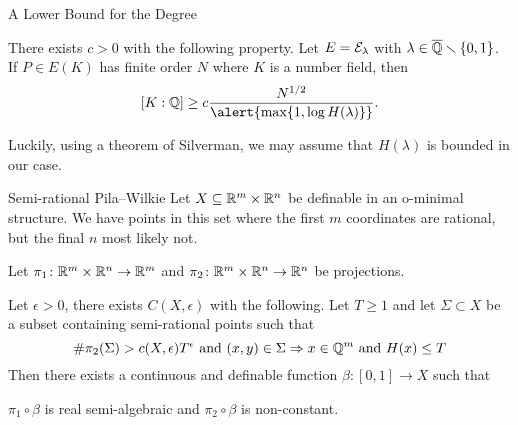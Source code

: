 \documentclass{beamer}
\begin{document}
\begin{frame}{A Lower Bound for the Degree}
  
  \begin{theorem}[David]
    There exists $c>0$ with the following property. 
    Let $E={\mathcal E}_\lambda$ with $\lambda\in{\overline{\mathbb{Q}}}\smallsetminus\{0,1\}$. If $P\in
    E(K)$ has finite order $N$ where $K$ is a number field, then
    \begin{equation}
      \label{eq:davidKQlb}
      [K:\IQ] \ge c \frac{N^{1/2}}{\alert{\max\{1,\log H(\lambda)\}}}.
    \end{equation}    
  \end{theorem}

  Luckily, using a theorem of \alert{Silverman}, we may assume that
  $H(\lambda)$ is bounded in our case.
  

\end{frame}


\begin{frame}{Semi-rational Pila--Wilkie}
  Let $X\subseteq {\mathbb{R}}^m\times{\mathbb{R}}^n$
  be definable in an o-minimal structure. 
  We have points in this set where the
  first $m$ coordinates are rational, but the final $n$ most likely not.

  Let $\pi_1\colon{\mathbb{R}}^m\times{\mathbb{R}}^n\rightarrow{\mathbb{R}}^m$ and
  $\pi_2\colon{\mathbb{R}}^m\times{\mathbb{R}}^n\rightarrow{\mathbb{R}}^n$ be projections.

  \begin{theorem}
    Let $\epsilon>0$, there exists $C(X,\epsilon)$ with the following. 
    Let $T\ge 1$ and let $\Sigma\subset X$ be a subset containing
    \alert{semi-rational points} such that
    $$
    \#\pi_2(\Sigma) > c(X,\epsilon) T^\epsilon \text{ and }
    (x,y)\in\Sigma\Rightarrow x\in {\mathbb{Q}}^m \text{ and }H(x)\le T
    $$  
    Then   there exists a continuous and definable function $\beta\colon
    [0,1]\rightarrow X$ such that
    \begin{center}
      $\pi_1\circ\beta$ is real semi-algebraic and
      $\pi_2\circ\beta$ is non-constant.  
    \end{center}  
  \end{theorem}
\end{frame}
\end{document}
